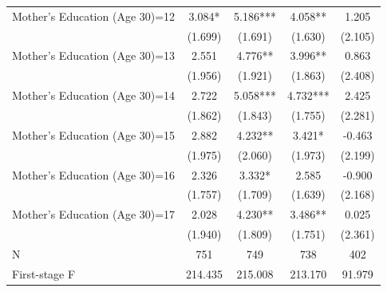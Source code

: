 \begin{table}[ht!]
{\begin{tabular}{l*{4}{c}}
Mother's Education (Age 30)=12&       3.084*  &       5.186***&       4.058** &       1.205   \\
                    &     (1.699)   &     (1.691)   &     (1.630)   &     (2.105)   \\
Mother's Education (Age 30)=13&       2.551   &       4.776** &       3.996** &       0.863   \\
                    &     (1.956)   &     (1.921)   &     (1.863)   &     (2.408)   \\
Mother's Education (Age 30)=14&       2.722   &       5.058***&       4.732***&       2.425   \\
                    &     (1.862)   &     (1.843)   &     (1.755)   &     (2.281)   \\
Mother's Education (Age 30)=15&       2.882   &       4.232** &       3.421*  &      -0.463   \\
                    &     (1.975)   &     (2.060)   &     (1.973)   &     (2.199)   \\
Mother's Education (Age 30)=16&       2.326   &       3.332*  &       2.585   &      -0.900   \\
                    &     (1.757)   &     (1.709)   &     (1.639)   &     (2.168)   \\
Mother's Education (Age 30)=17&       2.028   &       4.230** &       3.486** &       0.025   \\
                    &     (1.940)   &     (1.809)   &     (1.751)   &     (2.361)   \\
\midrule
N                   &         751   &         749   &         738   &         402   \\
First-stage F       &     214.435   &     215.008   &     213.170   &      91.979   \\
\bottomrule \end{tabular}}
\vspace{0.2cm} 
\end{table}
